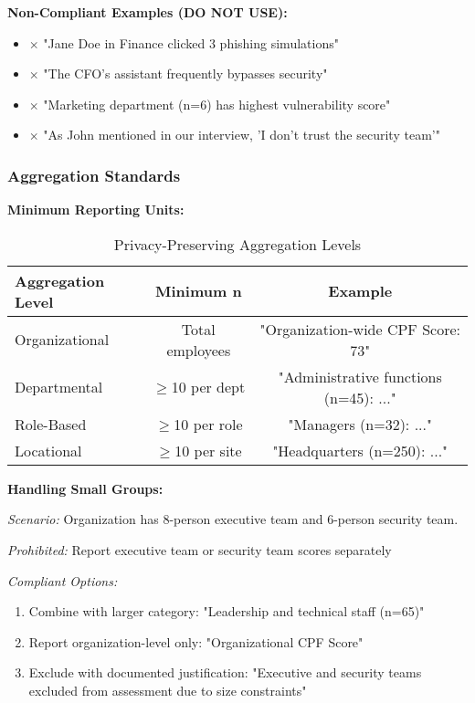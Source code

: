 \documentclass[11pt,a4paper]{article}
\begin{document}
\textbf{Non-Compliant Examples (DO NOT USE):}

\begin{itemize}
\item $\times$ "Jane Doe in Finance clicked 3 phishing simulations"
\item $\times$ "The CFO's assistant frequently bypasses security"
\item $\times$ "Marketing department (n=6) has highest vulnerability score"
\item $\times$ "As John mentioned in our interview, 'I don't trust the security team'"
\end{itemize}

\subsubsection{Aggregation Standards}

\textbf{Minimum Reporting Units:}

\begin{table}[h]
\centering
\caption{Privacy-Preserving Aggregation Levels}
\small
\begin{tabular}{lcc}
\toprule
\textbf{Aggregation Level} & \textbf{Minimum n} & \textbf{Example} \\
\midrule
Organizational & Total employees & "Organization-wide CPF Score: 73" \\
Departmental & $\geq$10 per dept & "Administrative functions (n=45): ..." \\
Role-Based & $\geq$10 per role & "Managers (n=32): ..." \\
Locational & $\geq$10 per site & "Headquarters (n=250): ..." \\
\bottomrule
\end{tabular}
\end{table}

\textbf{Handling Small Groups:}

\textit{Scenario:} Organization has 8-person executive team and 6-person security team.

\textit{Prohibited:} Report executive team or security team scores separately

\textit{Compliant Options:}
\begin{enumerate}
\item Combine with larger category: "Leadership and technical staff (n=65)"
\item Report organization-level only: "Organizational CPF Score"
\item Exclude with documented justification: "Executive and security teams excluded from assessment due to size constraints"
\end{enumerate}
\end{document}
